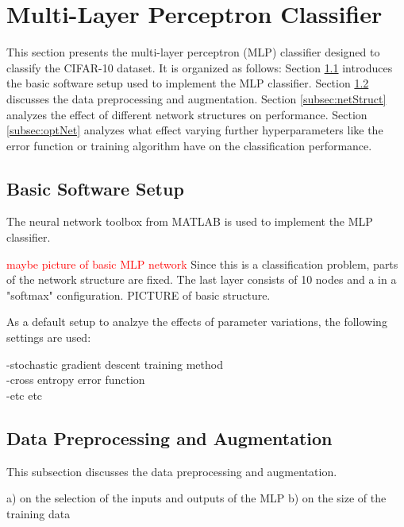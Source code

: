 \section{Multi-Layer Perceptron Classifier}
	    \pagestyle{mario}

This section presents the multi-layer perceptron (MLP) classifier designed to classify the CIFAR-10 dataset. It is organized as follows: Section \ref{subsec:setup} introduces the basic software setup used to implement the MLP classifier. Section \ref{subsec:preProp} discusses the data preprocessing and augmentation. Section \ref{subsec:netStruct} analyzes the effect of different network structures on performance. Section \ref{subsec:optNet} analyzes what effect varying further hyperparameters like the error function or training algorithm have on the classification performance.

\subsection{Basic Software Setup}\label{subsec:setup}

The neural network toolbox from MATLAB is used to implement the MLP classifier.

\textcolor{red}{maybe picture of basic MLP network}
Since this is a classification problem, parts of the network structure are fixed. The last layer consists of 10 nodes and a in a "softmax" configuration. PICTURE of basic structure.

As a default setup to analzye the effects of parameter variations, the following settings are used:

-stochastic gradient descent training method\\
-cross entropy error function\\
-etc etc\\

\subsection{Data Preprocessing and Augmentation}\label{subsec:preProp}
This subsection discusses the data preprocessing and augmentation.

a) on the selection of the inputs and outputs of the MLP
b) on the size of the training data

